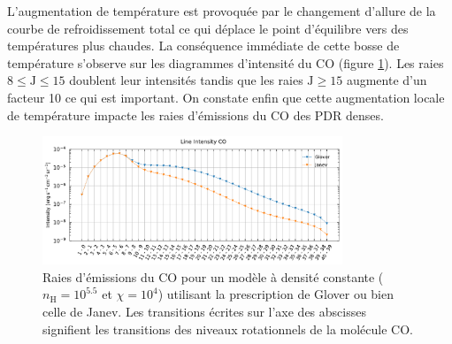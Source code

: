 L'augmentation de température est provoquée par le changement d'allure de la courbe de refroidissement total ce qui déplace le point d'équilibre vers des températures plus chaudes. La conséquence immédiate de cette bosse de température s'observe sur les diagrammes d'intensité du $\mathrm{CO}$ (figure \ref{fig:H2:bosse:ICO}). Les raies $ 8 \leq \mathrm{J}\leq 15$ doublent leur intensités tandis que les raies $\mathrm{J}\geq 15$ augmente d'un facteur 10 ce qui est important. On constate enfin que cette augmentation locale de température impacte les raies d'émissions du $\mathrm{CO}$ des PDR denses. 

\begin{figure}[!h]
    \centering
    \includegraphics[trim = {0 0 0 1cm },clip,width=0.8\textwidth]{figure/H2/bosse_dcte_janevVSglover/I_comp_CO.pdf}
    \caption{Raies d'émissions du $\mathrm{CO}$ pour un modèle à densité constante ($n_\mathrm{H} = 10^{5.5}$ et $\chi = 10^4$) utilisant la prescription de Glover ou bien celle de Janev. Les transitions écrites sur l'axe des abscisses signifient les transitions des niveaux rotationnels de la molécule $\mathrm{CO}$.}
    \label{fig:H2:bosse:ICO}
\end{figure}



